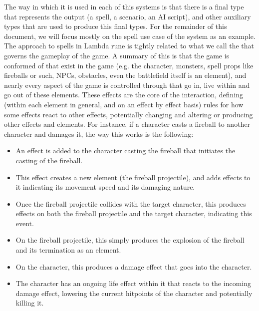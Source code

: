 \documentclass[12pt,a4paper]{article}
\begin{document}
The way in which it is used in each of this systems is that there is a final type that represents the output (a spell, a scenario, an AI script), and other auxiliary types that are used to produce this final types. For the remainder of this document, we will focus mostly on the spell use case of the system as an example.\\

The approach to spells in Lambda rune is tightly related to what we call the  that governs the gameplay of the game. A summary of this is that the game is conformed of  that exist in the game (e.g. the character, monsters, spell props like fireballs or such, NPCs, obstacles, even the battlefield itself is an element), and nearly every aspect of the game is controlled through  that go in, live within and go out of these elements. These effects are the core of the interaction, defining  (within each element in general, and on an effect by effect basis) rules for how some effects react to other effects, potentially changing and altering or producing other effects and elements. For instance, if a character casts a fireball to another character and damages it, the way this works is the following:

\begin{itemize}

\item An effect is added to the character casting the fireball that initiates the casting of the fireball.
\item This effect creates a new element (the fireball projectile), and adds effects to it indicating its movement speed and its damaging nature.
\item Once the fireball projectile collides with the target character, this produces effects on both the fireball projectile and the target character, indicating this event.
\item On the fireball projectile, this simply produces the explosion of the fireball and its termination as an element.
\item On the character, this produces a damage effect that goes into the character.
\item The character has an ongoing life effect within it that reacts to the incoming damage effect, lowering the current hitpoints of the character and potentially killing it.

\end{itemize}
\end{document}
